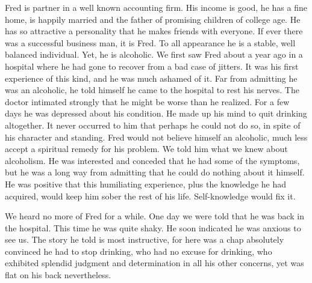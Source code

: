 \begin{biblechapter}

Fred is partner in a well known accounting firm. 
His income is good, he has a fine home, 
is happily married and the father of promising children of college age. 
He has so attractive a personality that he makes friends with everyone. 
If ever there was a successful business man, it is Fred. 
To all appearance he is a stable, well balanced individual. 
Yet, he is alcoholic. 
We first saw Fred about a year ago in a hospital where he had gone to recover from a bad case of jitters. 
It was his first experience of this kind, and he was much ashamed of it. 
Far from admitting he was an alcoholic, he told himself he came to the hospital to rest his nerves. 
The doctor intimated strongly that he might be worse than he realized. 
For a few days he was depressed about his condition. 
He made up his mind to quit drinking altogether. 
It never occurred to him that perhaps he could not do so, in spite of his character and standing. 
Fred would not believe himself an alcoholic, much less accept a spiritual remedy for his problem. 
We told him what we knew about alcoholism. 
He was interested and conceded that he had some of the symptoms, 
but he was a long way from admitting that he could do nothing about it himself. 
He was positive that this humiliating experience, 
plus the knowledge he had acquired, 
would keep him sober the rest of his life. 
Self-knowledge would fix it.

We heard no more of Fred for a while. 
One day we were told that he was back in the hospital. 
This time he was quite shaky. 
He soon indicated he was anxious to see us. 
The story he told is most instructive, 
for here was a chap absolutely convinced he had to stop drinking, 
who had no excuse for drinking, 
who exhibited splendid judgment and determination in all his other concerns, 
yet was flat on his back nevertheless.
\end{biblechapter}



